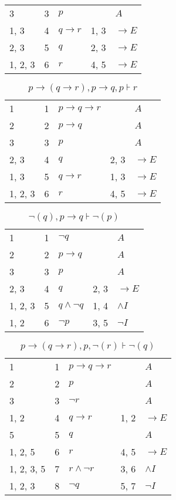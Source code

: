 \documentclass{article}
\begin{document}
\begin{table}[htbp]
\begin{tabular}{lllll}
{3} & 3 & $p$ & {} & $A$ \\
{1, 3} & 4 & $q→r$ & {1, 3} & $→E$ \\
{2, 3} & 5 & $q$ & {2, 3} & $→E$ \\
{1, 2, 3} & 6 & $r$ & {4, 5} & $→E$ \\
\end{tabular}
\end{table}\begin{table}[htbp]\caption*{$p→(q→r),p→q,p ⊦ r$}\centering\begin{tabular}{lllll}
{1} & 1 & $p→q→r$ & {} & $A$ \\
{2} & 2 & $p→q$ & {} & $A$ \\
{3} & 3 & $p$ & {} & $A$ \\
{2, 3} & 4 & $q$ & {2, 3} & $→E$ \\
{1, 3} & 5 & $q→r$ & {1, 3} & $→E$ \\
{1, 2, 3} & 6 & $r$ & {4, 5} & $→E$ \\
\end{tabular}
\end{table}\begin{table}[htbp]\caption*{$¬(q),p→q ⊦ ¬(p)$}\centering\begin{tabular}{lllll}
{1} & 1 & $¬q$ & {} & $A$ \\
{2} & 2 & $p→q$ & {} & $A$ \\
{3} & 3 & $p$ & {} & $A$ \\
{2, 3} & 4 & $q$ & {2, 3} & $→E$ \\
{1, 2, 3} & 5 & $q∧ ¬q$ & {1, 4} & $∧I$ \\
{1, 2} & 6 & $¬p$ & {3, 5} & $¬I$ \\
\end{tabular}
\end{table}\begin{table}[htbp]\caption*{$p→(q→r),p,¬(r) ⊦ ¬(q)$}\centering\begin{tabular}{lllll}
{1} & 1 & $p→q→r$ & {} & $A$ \\
{2} & 2 & $p$ & {} & $A$ \\
{3} & 3 & $¬r$ & {} & $A$ \\
{1, 2} & 4 & $q→r$ & {1, 2} & $→E$ \\
{5} & 5 & $q$ & {} & $A$ \\
{1, 2, 5} & 6 & $r$ & {4, 5} & $→E$ \\
{1, 2, 3, 5} & 7 & $r∧ ¬r$ & {3, 6} & $∧I$ \\
{1, 2, 3} & 8 & $¬q$ & {5, 7} & $¬I$ \\
\end{tabular}

\end{table}
\end{document}
